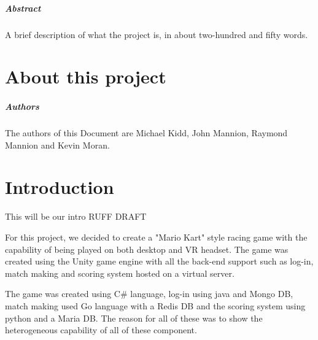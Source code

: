 
\paragraph{Abstract}
A brief description of what the project is, in about two-hundred and fifty words.

\chapter*{About this project}

\paragraph{Authors}
The authors of this Document are Michael Kidd, John Mannion, Raymond Mannion and Kevin Moran.

\chapter{Introduction}
This will be our intro RUFF DRAFT


For this project, we decided to create a "Mario Kart" style racing game 
with the capability of being played on both desktop and VR headset. The game was created using the Unity game engine with all the back-end support such as log-in, match making and scoring system hosted on a virtual server. 

The game was created using C# language, log-in using java and Mongo DB,
match making used Go language with a Redis DB and the scoring system using python and a Maria DB. The reason for all of these was to show the heterogeneous capability of all of these component.
